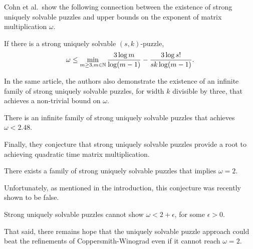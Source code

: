 \documentclass[11pt]{article}
\begin{document}
Cohn et al.~show the following connection between the existence of
strong uniquely solvable puzzles and upper bounds on the exponent of
matrix multiplication $\omega$.
\begin{lemma}
  \label{lem:omega}
  If there is a strong uniquely solvable $(s,k)$-puzzle,
  $$\omega \le \min_{m \ge 3, m \in \mathbb{N}} \frac{3 \log
    m}{\log(m-1)} - \frac{3 \log s!}{sk \log(m-1)}.$$
\end{lemma}
\noindent In the same article, the authors also demonstrate the
existence of an infinite family of strong uniquely solvable puzzles, for width $k$ divisible by three,
that achieves a non-trivial bound on $\omega$.
\begin{lemma}
  There is an infinite family of strong uniquely solvable puzzles that
  achieves $\omega < 2.48$.
\end{lemma}
\noindent Finally, they conjecture that strong uniquely solvable
puzzles provide a root to achieving quadratic time matrix
multiplication.
\begin{conjecture}
  There exists a family of strong uniquely solvable puzzles that
  implies $\omega = 2$.
\end{conjecture}
\noindent Unfortunately, as mentioned in the introduction, this conjecture was recently shown to be false.
\begin{lemma}
  Strong uniquely solvable puzzles cannot show $\omega < 2 +
  \epsilon$, for some $\epsilon > 0$.
\end{lemma}
That said, there remains hope that the uniquely solvable puzzle
approach could beat the refinements of Coppersmith-Winograd even if it
cannot reach $\omega = 2$.



\end{document}
